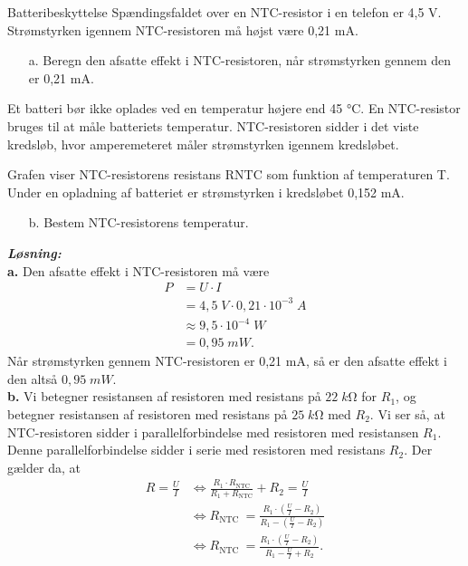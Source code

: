 \documentclass{report}
\newcommand{\sol}{\setlength{\parindent}{0cm}\textbf{\textit{Løsning:}}\setlength{\parindent}{1cm}}
\begin{document}
\begin{question}{Batteribeskyttelse}{}
Spændingsfaldet over en NTC-resistor i en telefon er 4,5 V. Strømstyrken igennem NTC-resistoren må højst være 0,21 mA.
\begin{itemize}
  \item[a.] Beregn den afsatte effekt i NTC-resistoren, når strømstyrken gennem den er 0,21 mA.
\end{itemize}

Et batteri bør ikke oplades ved en temperatur højere end 45 °C. En NTC-resistor bruges til at måle batteriets temperatur. NTC-resistoren sidder i det viste kredsløb, hvor amperemeteret måler strømstyrken igennem kredsløbet.

Grafen viser NTC-resistorens resistans RNTC som funktion af temperaturen T.
Under en opladning af batteriet er strømstyrken i kredsløbet 0,152 mA.
\begin{itemize}
  \item[b.] Bestem NTC-resistorens temperatur.
\end{itemize}
\end{question}
\sol \\
\textbf{a.}
Den afsatte effekt i NTC-resistoren må være
\begin{equation*}
\begin{split}
  P&= U \cdot I\\
  &=4,5 \;\unit{V} \cdot 0,21 \cdot 10 ^{-3} \;\unit{A} \\
  &\approx 9,5 \cdot 10 ^{-4} \;\unit{W} \\
  &=0,95 \;\unit{mW}.
\end{split}
\end{equation*}
Når strømstyrken gennem NTC-resistoren er 0,21 mA, så er den afsatte effekt i den altså $0,95 \;\unit{mW}$. \\[1ex]
\textbf{b.}
Vi betegner resistansen af resistoren med resistans på $22 \;\unit{k \ohm} $ for $R_1$, og betegner resistansen af resistoren med resistans på $25 \;\unit{k \ohm} $ med $R_2$.
Vi ser så, at NTC-resistoren sidder i parallelforbindelse med resistoren med resistansen $R_1$.
Denne parallelforbindelse sidder i serie med resistoren med resistans $R_2$.
Der gælder da, at
\begin{equation*}
\begin{split}
  R=\frac{U}{I} &\iff \frac{R_1 \cdot R _{\text{NTC} }}{R_1 + R _{\text{NTC} }}+R_2=\frac{U}{I}\\
  &\iff R _{\text{NTC } }=\frac{R_1 \cdot \left(\frac{U}{I}-R_2\right) }{R_1-\left( \frac{U}{I}-R_2\right)}\\
  &\iff R _{\text{NTC } }=\frac{R_1 \cdot \left(\frac{U}{I}-R_2\right) }{R_1-\frac{U}{I}+R_2}.
\end{split}
\end{equation*}
\end{document}
